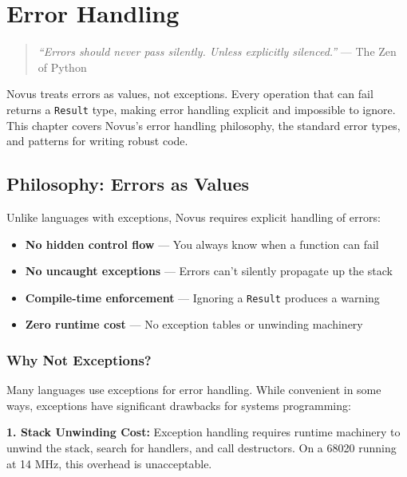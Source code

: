 \chapter{Error Handling}
\label{ch:error-handling}

\begin{quote}
\textit{``Errors should never pass silently. Unless explicitly silenced.''} --- The Zen of Python
\end{quote}

Novus treats errors as values, not exceptions. Every operation that can fail returns a \texttt{Result} type, making error handling explicit and impossible to ignore. This chapter covers Novus's error handling philosophy, the standard error types, and patterns for writing robust code.

\section{Philosophy: Errors as Values}
\label{sec:error-philosophy}

Unlike languages with exceptions, Novus requires explicit handling of errors:

\begin{itemize}
    \item \textbf{No hidden control flow} --- You always know when a function can fail
    \item \textbf{No uncaught exceptions} --- Errors can't silently propagate up the stack
    \item \textbf{Compile-time enforcement} --- Ignoring a \texttt{Result} produces a warning
    \item \textbf{Zero runtime cost} --- No exception tables or unwinding machinery
\end{itemize}

\subsection{Why Not Exceptions?}

Many languages use exceptions for error handling. While convenient in some ways, exceptions have significant drawbacks for systems programming:

\textbf{1. Stack Unwinding Cost:}
Exception handling requires runtime machinery to unwind the stack, search for handlers, and call destructors. On a 68020 running at 14 MHz, this overhead is unacceptable.

